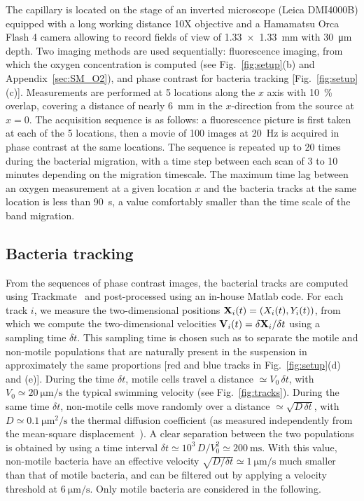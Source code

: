 \documentclass[aps,a4paper,twocolumn,10pt,pre,showpacs]{revtex4-2}
\begin{document}
The capillary is located on the stage of an inverted microscope (Leica DMI4000B) equipped with a long working distance 10X objective and a Hamamatsu Orca Flash 4 camera allowing to record fields of view of \SI{1.33x1.33}{mm} with \SI{30}{\um} depth. Two imaging methods are used sequentially: fluorescence imaging, from which the oxygen concentration is computed (see Fig.~\ref{fig:setup}(b) and Appendix~\ref{sec:SM_O2}), and phase contrast for bacteria tracking [Fig.~\ref{fig:setup}(c)]. Measurements are performed at 5 locations along the $x$ axis with \SI{10}{\%} overlap, covering a distance of nearly \SI{6}{\mm} in the $x$-direction from the source at $x=0$. The acquisition sequence is as follows: a fluorescence picture is first taken at each of the 5 locations, then a movie of 100 images at \SI{20}{Hz} is acquired in phase contrast at the same locations. The sequence is repeated up to 20 times during the bacterial migration, with a time step between each scan of 3 to 10 minutes depending on the migration timescale. The maximum time lag between an oxygen measurement at a given location $x$ and the bacteria tracks at the same location is less than \SI{90}{\s}, a value comfortably smaller than the time scale of the band migration.



\subsection{Bacteria tracking}
\label{sec:bact_track}

From the sequences of phase contrast images, the bacterial tracks are computed using Trackmate~\cite{tinevez2017trackmate} and post-processed using an in-house Matlab code. For each track $i$, we measure the two-dimensional positions ${\bf X}_i(t)=(X_i(t),Y_i(t))$, from which we compute the two-dimensional velocities ${\bf V}_i(t) = \delta {\bf X}_i / \delta t$ using a sampling time $\delta t$. This sampling time is chosen such as to separate the motile and non-motile populations that are naturally present in the suspension in approximately the same proportions [red and blue tracks in Fig.~\ref{fig:setup}(d) and (e)]. During the time $\delta t$, motile cells travel a distance $\simeq V_0\,\delta t$, with $V_0 \simeq \SI{20}{\um\per\s}$ the typical swimming velocity (see Fig.~\ref{fig:tracks}). During the same time $\delta t$, non-motile cells move randomly over a distance $\simeq \sqrt{D \, \delta t}$, with $D \simeq \SI{0.1}{\square\um\per\s}$  the thermal diffusion coefficient (as measured independently from the mean-square displacement~\cite{bouvard2022}). A clear separation between the two populations is obtained by using a time interval $\delta t \simeq 10^3 \, D / V_0^2  \simeq \SI{200}{\ms}$. With this value, non-motile bacteria have an effective velocity $\sqrt{D / \delta t} \simeq \SI{1}{\um\per\s}$ much smaller than that of motile bacteria, and can be filtered out by applying a velocity threshold at $\SI{6}{\um\per\s}$.  Only motile bacteria are considered in the following.
\end{document}
